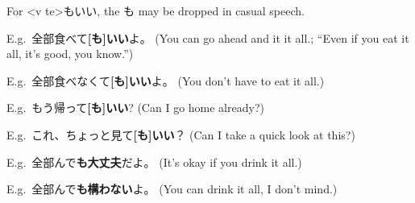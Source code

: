 \documentclass[../nihongo-gakushuu-kyouzai.tex]{subfiles}
\begin{document}
For <v te>もいい, the も may be dropped in casual speech.

E.g.\ 全部食べて\textbf{[も]いい}よ。 (You can go ahead and it it all.; ``Even if you eat it all, it's good, you know.'')

E.g.\ 全部食べなくて\textbf{[も]いい}よ。 (You don't have to eat it all.)

E.g.\ もう帰って\textbf{[も]いい}? (Can I go home already?)

E.g.\ これ、ちょっと見て\textbf{[も]いい}？ (Can I take a quick look at this?)

E.g.\ 全部んで\textbf{も大丈夫}だよ。 (It's okay if you drink it all.)

E.g.\ 全部んで\textbf{も構わない}よ。 (You can drink it all, I don't mind.)
\end{document}
